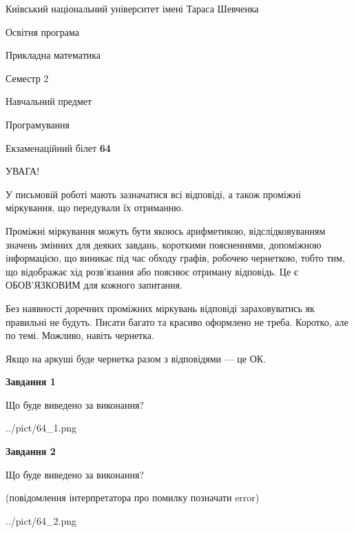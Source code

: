 \documentclass[12pt, ukrainian]{article}
\begin{document}
{{\begin {small}\par
{ \center  Київський національний університет імені Тараса Шевченка \par}
{\parbox {5 cm}{Освітня програма \hfill}{\parbox {7 cm}{Прикладна математика\hfill}}\parbox {6 cm}{\hfill Семестр 2}}\par
{\parbox {5 cm} {Навчальний предмет \hfill}\parbox {7 cm}{Програмування \hfill}\parbox {6cm}{\hfill}\par}\vspace{-7pt} \end{small}}{\center Екзаменаційний білет \No \textbf
{ 64 }\par}}
{
\begin {large}
УВАГА!

У письмовій роботі мають зазначатися всі відповіді, а також проміжні міркування, що передували їх отриманню.

Проміжні міркування можуть бути якоюсь арифметикою, відслідковуванням зна\-чень змінних для деяких завдань,
короткими поясненнями, допоміжною інформацією, що виникає під час обходу графів, робочею чернеткою,
тобто тим, що відображає хід розв’язання або пояснює отриману відповідь.
Це є ОБОВ’ЯЗКОВИМ для кожного запитання.

Без наявності доречних проміжних міркувань відповіді зараховуватись як правиль\-ні не будуть.
Писати багато та красиво оформлено не треба. Коротко, але по темі. Можли\-во, навіть чернетка.

Якщо на аркуші буде чернетка разом з відповідями --- це ОК.

\newpage

{\begin {center}\textbf{Завдання 1}\end {center}}\par
Що буде виведено за виконання?\par
\begin{center}
	{../pict/64_1.png}
\end{center}
\newpage

{\begin {center}\textbf{Завдання 2}\end {center}}\par
Що буде виведено за виконання?\par
 (повідомлення інтерпретатора про помилку позначати error)\par
\begin{center}
	{../pict/64_2.png}
\end{center}
\newpage


\end{large}}
\end{document}

